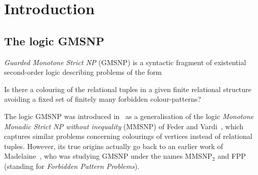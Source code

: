 \documentclass[oneside,reqno,12pt]{amsart}
\theoremstyle{plain}
\theoremstyle{remark}
\newcommand{\MMSNP}{\ensuremath{\mathrm{MMSNP}}\xspace}
\newcommand{\GMSNP}{\ensuremath{\mathrm{GMSNP}}\xspace}
\begin{document}
\maketitle

\setlength{}
\setlength\emergencystretch{1pt}
\pagestyle{plain}
\addtolength{\textheight}{-\baselineskip}
\addtolength{\footskip}{\baselineskip}   




\section{Introduction}\label{section:introduction}
\subsection{The logic GMSNP} \label{sec:intro_one}

\emph{Guarded Monotone Strict NP} ($\GMSNP$) is a syntactic fragment of existential second-order logic 
describing problems of the form
\begin{center} \vspace{0.75em}
    {\it \parbox{0.725\textwidth}{Is there a colouring of the relational tuples in a given finite relational structure avoiding a fixed set of finitely many forbidden colour-patterns?}} \vspace{0.75em}
\end{center} 
The logic GMSNP was introduced in~\cite{bienvenu2014} as a generalisation of the logic \emph{Monotone Monadic Strict NP without inequality} ($\MMSNP$) of Feder and Vardi~\cite{federvardi1998}, which captures similar problems concerning colourings of vertices instead of relational tuples.
However, its true origins actually go back to an earlier work of Madelaine~\cite{madelaine2009universal}, who was studying GMSNP under the names MMSNP$_2$ and FPP (standing for \emph{Forbidden Pattern Problems}).
\end{document}
